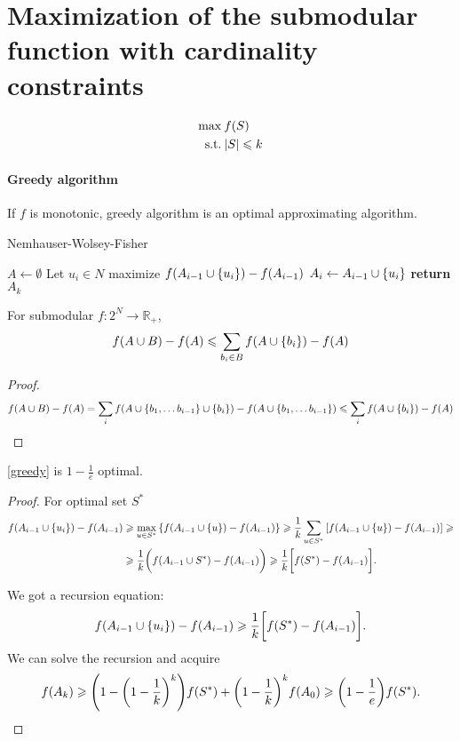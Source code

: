 \section{Maximization of the submodular function with cardinality constraints}
\begin{align}
\max \: & f(S)\\
\text{s.t.} \: & \abs{S} \leqslant k
\end{align}

\paragraph{Greedy algorithm}
If $f$ is monotonic, greedy algorithm is an optimal approximating algorithm.
\begin{algorithm}
	\caption{Nemhauser-Wolsey-Fisher}\label{greedy}
	\begin{algorithmic}[1]
		\State $A \gets \emptyset$
		\State Let $u_i\in N$ maximize $f(A_{i-1} \cup \qty{u_i}) - f(A_{i-1})$
		\State $ A_i \gets A_{i-1} \cup \qty{u_i}$
		\EndFor
		\State \textbf{return} $A_k$
		\EndProcedure
	\end{algorithmic}
\end{algorithm}
\begin{lemma}
	For submodular $f: 2^N \to \mathbb{R}_+$,
	\begin{align}
	f(A\cup B) - f(A) \leqslant \sum_{b_i \in B} f(A\cup \qty{b_i}) - f(A)
	\end{align}
	\begin{proof}
		\begin{align}
		f(A\cup B) - f(A) = \sum_i f(A \cup \qty{b_1, \dots b_{i-1}} \cup \qty{b_i} ) - f(A \cup \qty{b_1, \dots b_{i-1}})\leqslant \sum_i f(A \cup \qty{b_i}) - f(A)
		\end{align}
	\end{proof}
\end{lemma}
\begin{prop} \label{greedy_proof}
	\cref{greedy} is $1-\frac{1}{e}$ optimal.
	\begin{proof}
		For optimal set $S^*$
		\begin{align}
		f(A_{i-1} \cup \qty{u_i}) - f(A_{i-1})&\geqslant \max\limits_{u\in S^*} \qty{f(A_{i-1} \cup \qty{u}) - f(A_{i-1})} \geqslant \frac{1}{k} \sum_{u\in S^*} \qty[f(A_{i-1} \cup \qty{u}) - f(A_{i-1})] \geqslant\\&\geqslant \frac{1}{k} \qty\bigg(f(A_{i-1} \cup S^*) - f(A_{i-1})) \geqslant \frac{1}{k} \qty\bigg[f(S^*) - f(A_{i-1})].
		\end{align}
		
		We got a recursion equation:
		\begin{align}
		f(A_{i-1} \cup \qty{u_i}) - f(A_{i-1})\geqslant \frac{1}{k} \qty\bigg[f(S^*) - f(A_{i-1})].
		\end{align}
		We can solve the recursion and acquire
		\begin{align}
		f(A_{k}) \geqslant \qty(1-\qty(1-\frac{1}{k})^k)f(S^*) + \qty(1-\frac{1}{k})^k f(A_0) \geqslant \qty(1-\frac{1}{e}) f(S^*).
		\end{align}		
	\end{proof}
\end{prop}

